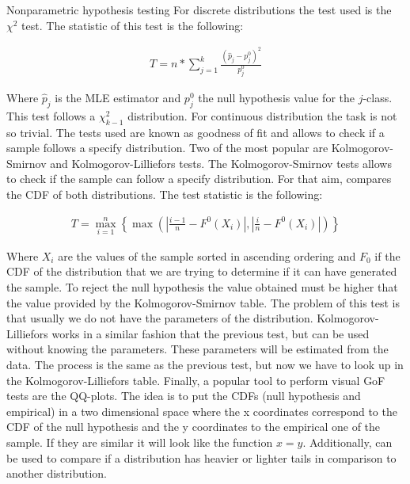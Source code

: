\documentclass{beamer}
\begin{document}
\begin{columns}
\begin{column}{0.3\textwidth}
\begin{block}{Nonparametric hypothesis testing}
For discrete distributions the test used is the $\chi^2$ test. The statistic of this test is the following:

\begin{align*}
    T = n * \sum_{j=1}^k \frac{(\hat{p}_j - p^0_j)^2}{p^0_j}
\end{align*}

Where $\hat{p}_j$ is the MLE estimator and $p^0_j$ the null hypothesis value for the $j$-class. This test follows a $\chi^2_{k-1}$ distribution. For continuous distribution the task is not so trivial. The tests used are known as goodness of fit and allows to check if a sample follows a specify distribution. Two of the most popular are Kolmogorov-Smirnov and Kolmogorov-Lilliefors tests. \newline \newline
The Kolmogorov-Smirnov tests allows to check if the sample can follow a specify distribution. For that aim, compares the CDF of both distributions. The test statistic is the following:

\begin{align*}
    T = \max_{i=1}^{n} \left\{ \max \left( \left| \frac{i-1}{n} - F^0(X_i) \right|, \left| \frac{i}{n} - F^0(X_i) \right| \right) \right\}
\end{align*}

Where $X_i$ are the values of the sample sorted in ascending ordering and $F_0$ if the CDF of the distribution that we are trying to determine if it can have generated the sample. To reject the null hypothesis the value obtained must be higher that the value provided by the Kolmogorov-Smirnov table. The problem of this test is that usually we do not have the parameters of the distribution. \newline \newline Kolmogorov-Lilliefors works in a similar fashion that the previous test, but can be used without knowing the parameters. These parameters will be estimated from the data. The process is the same as the previous test, but now we have to look up in the Kolmogorov-Lilliefors table. \newline \newline
Finally, a popular tool to perform visual GoF tests are the QQ-plots. The idea is to put the CDFs (null hypothesis and empirical) in a two dimensional space where the x coordinates correspond to the CDF of the null hypothesis and the y coordinates to the empirical one of the sample. If they are similar it will look like the function $x=y$. Additionally, can be used to compare if a distribution has heavier or lighter tails in comparison to another distribution.


\end{block}
\end{column}
\end{columns}
\end{document}
